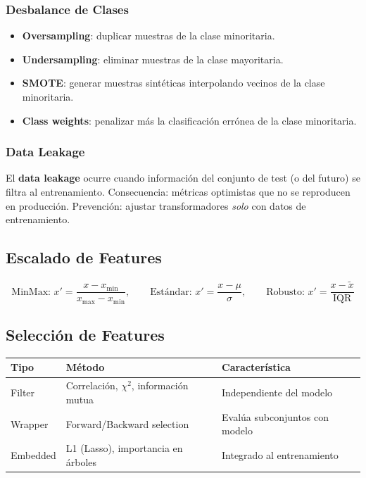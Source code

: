 \documentclass[12pt, a4paper]{article}
\begin{document}
\subsubsection{Desbalance de Clases}
\begin{itemize}
  \item \textbf{Oversampling}: duplicar muestras de la clase minoritaria.
  \item \textbf{Undersampling}: eliminar muestras de la clase mayoritaria.
  \item \textbf{SMOTE}: generar muestras sintéticas interpolando vecinos de la clase minoritaria.
  \item \textbf{Class weights}: penalizar más la clasificación errónea de la clase minoritaria.
\end{itemize}

\subsubsection{Data Leakage}
\begin{notebox}
  El \textbf{data leakage} ocurre cuando información del conjunto de test (o del futuro)
  se filtra al entrenamiento. Consecuencia: métricas optimistas que no se reproducen en
  producción. Prevención: ajustar transformadores \emph{solo} con datos de entrenamiento.
\end{notebox}

\subsection{Escalado de Features}
\[
  \text{MinMax: } x' = \frac{x - x_{\min}}{x_{\max} - x_{\min}}, \qquad
  \text{Estándar: } x' = \frac{x - \mu}{\sigma}, \qquad
  \text{Robusto: } x' = \frac{x - \tilde{x}}{\text{IQR}}
\]

\subsection{Selección de Features}
\begin{center}
\begin{tabular}{lll}
\toprule
\textbf{Tipo} & \textbf{Método} & \textbf{Característica} \\
\midrule
Filter & Correlación, $\chi^2$, información mutua & Independiente del modelo \\
Wrapper & Forward/Backward selection & Evalúa subconjuntos con modelo \\
Embedded & L1 (Lasso), importancia en árboles & Integrado al entrenamiento \\
\bottomrule
\end{tabular}
\end{center}
\end{document}
